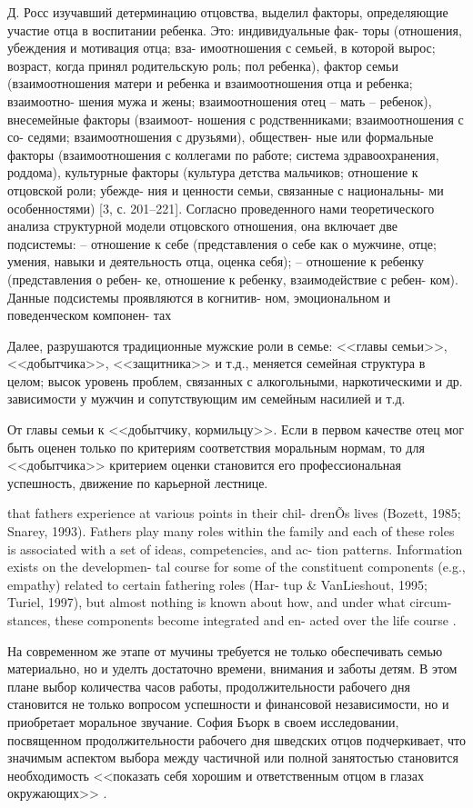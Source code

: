 \documentclass{../../common/thesisbyxetex}
\begin{document}
Д. Росс изучавший детерминацию отцовства,
выделил факторы, определяющие участие отца
в воспитании ребенка. Это: индивидуальные фак-
торы (отношения, убеждения и мотивация отца; вза-
имоотношения с семьей, в которой вырос; возраст,
когда принял родительскую роль; пол ребенка),
фактор семьи (взаимоотношения матери и ребенка
и взаимоотношения отца и ребенка; взаимоотно-
шения мужа и жены; взаимоотношения отец –
мать – ребенок), внесемейные факторы (взаимоот-
ношения с родственниками; взаимоотношения с со-
седями; взаимоотношения с друзьями), обществен-
ные или формальные факторы (взаимоотношения
с коллегами по работе; система здравоохранения,
роддома), культурные факторы (культура детства
мальчиков; отношение к отцовской роли; убежде-
ния и ценности семьи, связанные с национальны-
ми особенностями) [3, с. 201–221].
Согласно проведенного нами теоретического
анализа структурной модели отцовского отношения,
она включает две подсистемы:
– отношение к себе (представления о себе как
о мужчине, отце; умения, навыки и деятельность
отца, оценка себя);
– отношение к ребенку (представления о ребен-
ке, отношение к ребенку, взаимодействие с ребен-
ком).
Данные подсистемы проявляются в когнитив-
ном, эмоциональном и поведенческом компонен-
тах \cite[40]{otage}




Далее, разрушаются традиционные мужские роли в семье: <<главы семьи>>,
<<добытчика>>, <<защитника>> и т.д., меняется семейная структура в целом; высок уровень проблем,
связанных с алкогольными, наркотическими и др. зависимости у мужчин и сопутствующим им семейным
насилией и т.д.

От главы семьи к <<добытчику, кормильцу>>. Если в первом качестве отец мог быть оценен только по
критериям
соответствия моральным нормам, то для <<добытчика>> критерием оценки становится его 
профессиональная успешность, движение по карьерной лестнице. 

that fathers experience at various points in their chil-
drenÕs lives (Bozett, 1985; Snarey, 1993). Fathers play
many roles within the family and each of these roles is
associated with a set of ideas, competencies, and ac-
tion patterns. Information exists on the developmen-
tal course for some of the constituent components
(e.g., empathy) related to certain fathering roles (Har-
tup \& VanLieshout, 1995; Turiel, 1997), but almost
nothing is known about how, and under what circum-
stances, these components become integrated and en-
acted over the life course \cite[131]{f21}.


На современном же этапе от мучины требуется не только обеспечивать семью материально, но и уделть 
достаточно времени, внимания и заботы детям. В этом плане выбор количества часов работы, 
продолжительности рабочего дня становится не только вопросом успешности и финансовой независимости, 
но и приобретает моральное звучание. София Бъорк в своем исследовании, посвященном  
продолжительности рабочего дня шведских отцов подчеркивает, что значимым аспектом  выбора 
между частичной или полной занятостью становится необходимость <<показать себя хорошим и 
ответственным отцом в глазах окружающих>> \cite[221]{morfat}.
\end{document}
